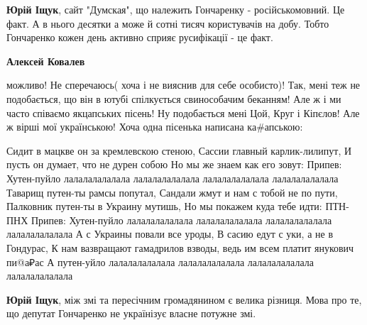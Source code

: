 \begin{itemize}
\begin{itemize}
 
\textbf{Юрій Іщук}, сайт "Думская", що належить Гончаренку - російськомовний.
Це факт. А в нього десятки а може й сотні тисяч користувачів на добу. Тобто
Гончаренко кожен день активно сприяє русифікації - це факт.

 
\textbf{Алексей Ковалев} 

можливо! Не сперечаюсь( хоча і не вияснив для себе особисто)! Так, мені теж не
подобається, що він в ютубі спілкується свинособачим беканням! Але ж і ми часто
співаємо якцапських пісень! Ну подобається мені Цой, Круг і Кіпєлов! Але ж
вірші мої українською! Хоча одна пісенька написана ка\#апською:

\obeycr
Сидит в мацкве он за кремлевскою стеною,
Сассии главный карлик-лилипут,
И пусть он думает, что не дурен собою
Но мы же знаем как его зовут:
\smallskip
Припев:
\smallskip
Хутен-пуйло лалалалалалала лалалалалалала лалалалалалала лалалалалалала
Таварищ путен-ты рамсы попутал,
Сандали жмут и нам с тобой не по пути,
Палковник путен-ты в Украину мутишь,
Но мы покажем куда тебе идти:
\smallskip
ПТН-ПНХ
\smallskip
Припев:
\smallskip
Хутен-пуйло лалалалалалала лалалалалалала лалалалалалала лалалалалалала
А с Украины повали все уроды,
В сасию едут с уки, а не в Гондурас,
К нам вазвращают гамадрилов взводы, ведь им всем платит янукович пи@а₽ас
А путен-уйло лалалалалалала лалалалалалала лалалалалалала лалалалалалала
\restorecr

 
\textbf{Юрій Іщук}, між змі та пересічним громадянином є велика різниця. Мова про те, що депутат Гончаренко не українізує власне потужне змі.

 

\end{itemize}
\end{itemize}
